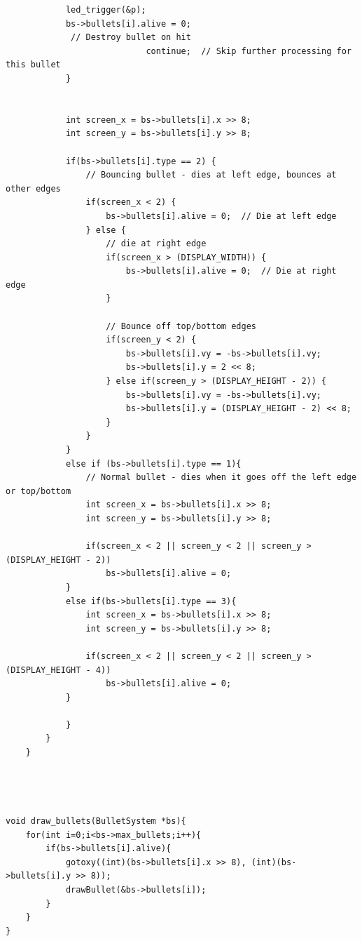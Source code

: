 \begin{lstlisting}
            led_trigger(&p);
            bs->bullets[i].alive = 0;
             // Destroy bullet on hit
                            continue;  // Skip further processing for this bullet
            }


            int screen_x = bs->bullets[i].x >> 8;
            int screen_y = bs->bullets[i].y >> 8;

            if(bs->bullets[i].type == 2) {
                // Bouncing bullet - dies at left edge, bounces at other edges
                if(screen_x < 2) {
                    bs->bullets[i].alive = 0;  // Die at left edge
                } else {
                    // die at right edge
                    if(screen_x > (DISPLAY_WIDTH)) {
                        bs->bullets[i].alive = 0;  // Die at right edge
                    }
            
                    // Bounce off top/bottom edges
                    if(screen_y < 2) {
                        bs->bullets[i].vy = -bs->bullets[i].vy;
                        bs->bullets[i].y = 2 << 8;
                    } else if(screen_y > (DISPLAY_HEIGHT - 2)) {
                        bs->bullets[i].vy = -bs->bullets[i].vy;
                        bs->bullets[i].y = (DISPLAY_HEIGHT - 2) << 8;
                    }
                }
            } 
            else if (bs->bullets[i].type == 1){
                // Normal bullet - dies when it goes off the left edge or top/bottom
                int screen_x = bs->bullets[i].x >> 8;
                int screen_y = bs->bullets[i].y >> 8;
                
                if(screen_x < 2 || screen_y < 2 || screen_y > (DISPLAY_HEIGHT - 2))
                    bs->bullets[i].alive = 0;
            }
            else if(bs->bullets[i].type == 3){
                int screen_x = bs->bullets[i].x >> 8;
                int screen_y = bs->bullets[i].y >> 8;
                
                if(screen_x < 2 || screen_y < 2 || screen_y > (DISPLAY_HEIGHT - 4))
                    bs->bullets[i].alive = 0;
            }

            }
        }
    }




void draw_bullets(BulletSystem *bs){
    for(int i=0;i<bs->max_bullets;i++){
        if(bs->bullets[i].alive){
            gotoxy((int)(bs->bullets[i].x >> 8), (int)(bs->bullets[i].y >> 8));
            drawBullet(&bs->bullets[i]);
        }
    }
}
\end{lstlisting}

